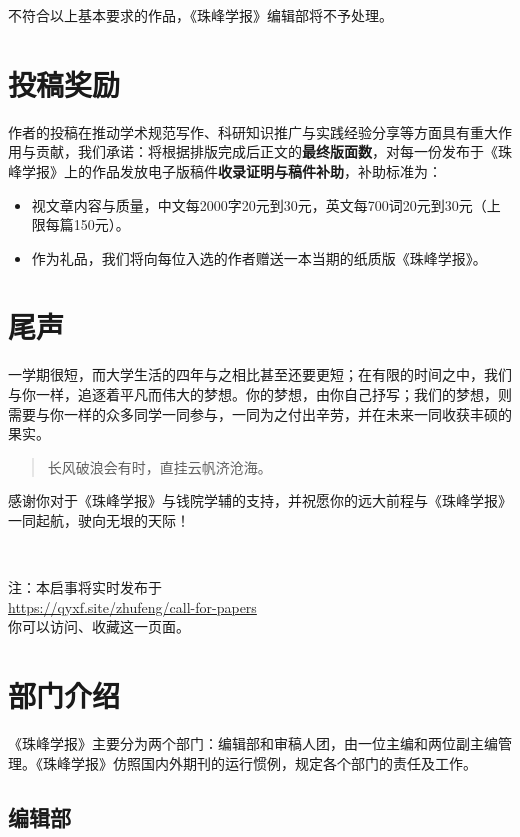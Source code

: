 \documentclass[
decoration,  %
]{qyxf-book}
\begin{document}
\begin{multicols}{2}
	不符合以上基本要求的作品，《珠峰学报》编辑部将不予处理。
	
	\section*{投稿奖励}
	
	作者的投稿在推动学术规范写作、科研知识推广与实践经验分享等方面具有重大作用与贡献，我们承诺：将根据排版完成后正文的\textbf{最终版面数}，对每一份发布于《珠峰学报》上的作品发放电子版稿件\textbf{收录证明与稿件补助}，补助标准为：
	
	\begin{itemize}%
		\item
		视文章内容与质量，中文每2000字20元到30元，英文每700词20元到30元（上限每篇150元）。
		\item
		作为礼品，我们将向每位入选的作者赠送一本当期的纸质版《珠峰学报》。
	\end{itemize}
	
	\section*{尾声}
	
	一学期很短，而大学生活的四年与之相比甚至还要更短；在有限的时间之中，我们与你一样，追逐着平凡而伟大的梦想。你的梦想，由你自己抒写；我们的梦想，则需要与你一样的众多同学一同参与，一同为之付出辛劳，并在未来一同收获丰硕的果实。
	
	\begin{quote}
		\fangsong 长风破浪会有时，直挂云帆济沧海。
	\end{quote}
	
	感谢你对于《珠峰学报》与钱院学辅的支持，并祝愿你的远大前程与《珠峰学报》一同起航，驶向无垠的天际！
	
	\ 
	
	\noindent 注：本启事将实时发布于\\
		\url{https://qyxf.site/zhufeng/call-for-papers}
	\\
	你可以访问、收藏这一页面。
	
    \section*{部门介绍}
    
    《珠峰学报》主要分为两个部门：编辑部和审稿人团，由一位主编和两位副主编管理。《珠峰学报》仿照国内外期刊的运行惯例，规定各个部门的责任及工作。
    
    \subsection*{编辑部}
    

\end{multicols}
\end{document}
